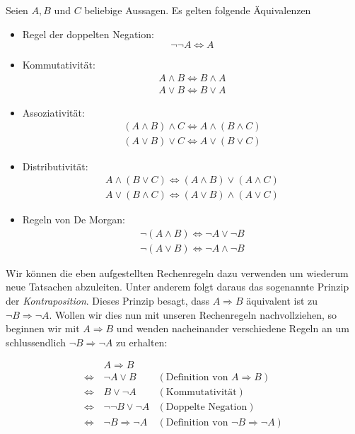 \begin{rk}[Junktorenregeln]
 Seien $A,B$ und $C$ beliebige Aussagen. Es gelten folgende Äquivalenzen
\begin{itemize}
 \item Regel der doppelten Negation:
\[
 \neg\neg A\Leftrightarrow A
\]
\item Kommutativität:
\begin{align*}
  A\wedge B\Leftrightarrow B\wedge A\\
  A\vee B\Leftrightarrow B\vee A
\end{align*}
\item Assoziativität:
\begin{align*}
 (A\wedge B)\wedge C\Leftrightarrow A\wedge (B\wedge C)\\
 (A\vee B)\vee C\Leftrightarrow A\vee (B\vee C)
\end{align*}

\item Distributivität:
\begin{align*}
 A\wedge (B\vee C)\Leftrightarrow (A\wedge B)\vee (A\wedge C)\\
 A\vee (B\wedge C)\Leftrightarrow (A\vee B)\wedge (A\vee C)
\end{align*}

\item Regeln von De Morgan:
\begin{align*}
 \neg(A\wedge B)\Leftrightarrow\neg A\vee\neg B\\
\neg(A\vee B)\Leftrightarrow \neg A\wedge\neg B
\end{align*}
\end{itemize}
\end{rk}


\begin{bsp}[Kontraposition]
Wir können die eben aufgestellten Rechenregeln dazu verwenden um wiederum neue Tatsachen abzuleiten. Unter anderem folgt daraus das sogenannte Prinzip der \textit{Kontraposition}. Dieses Prinzip besagt, dass $A\Rightarrow B$ äquivalent ist zu $\neg B\Rightarrow\neg A$. Wollen wir dies nun mit unseren Rechenregeln nachvollziehen, so beginnen wir mit $A\Rightarrow B$ und wenden nacheinander verschiedene Regeln an um schlussendlich $\neg B\Rightarrow \neg A$ zu erhalten:

\begin{align*}
                     &A\Rightarrow B\\
   \Leftrightarrow\, &\neg A\lor B                  &(\text{Definition von }A\Rightarrow B)\\
   \Leftrightarrow\, &B\lor \neg A                  &(\text{Kommutativität})\\
   \Leftrightarrow\, &\neg\neg B\lor\neg A          &(\text{Doppelte Negation})\\
   \Leftrightarrow\, &\neg B\Rightarrow \neg A      &(\text{Definition von }\neg B\Rightarrow\neg A)
\end{align*}
\end{bsp}

